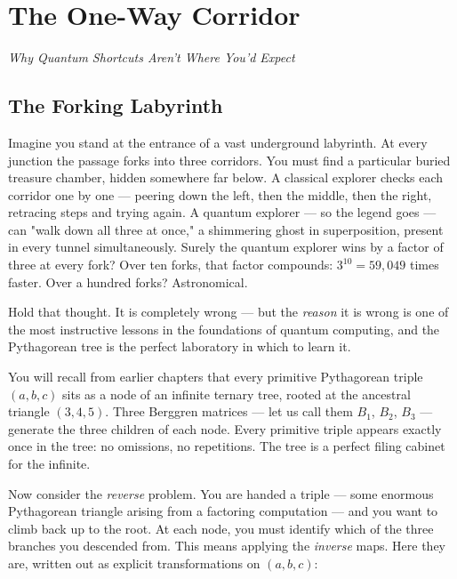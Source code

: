 \chapter{The One-Way Corridor}



\begin{center}\textit{Why Quantum Shortcuts Aren't Where You'd Expect}\end{center}
\bigskip


\ornbreak



\section{The Forking Labyrinth}


Imagine you stand at the entrance of a vast underground labyrinth. At every junction the passage forks into three corridors. You must find a particular buried treasure chamber, hidden somewhere far below. A classical explorer checks each corridor one by one --- peering down the left, then the middle, then the right, retracing steps and trying again. A quantum explorer --- so the legend goes --- can "walk down all three at once," a shimmering ghost in superposition, present in every tunnel simultaneously. Surely the quantum explorer wins by a factor of three at every fork? Over ten forks, that factor compounds: $3^{10} = 59{,}049$ times faster. Over a hundred forks? Astronomical.

Hold that thought. It is completely wrong --- but the \textit{reason} it is wrong is one of the most instructive lessons in the foundations of quantum computing, and the Pythagorean tree is the perfect laboratory in which to learn it.

You will recall from earlier chapters that every primitive Pythagorean triple $(a, b, c)$ sits as a node of an infinite ternary tree, rooted at the ancestral triangle $(3, 4, 5)$. Three Berggren matrices --- let us call them $B_1$, $B_2$, $B_3$ --- generate the three children of each node. Every primitive triple appears exactly once in the tree: no omissions, no repetitions. The tree is a perfect filing cabinet for the infinite.

Now consider the \textit{reverse} problem. You are handed a triple --- some enormous Pythagorean triangle arising from a factoring computation --- and you want to climb back up to the root. At each node, you must identify which of the three branches you descended from. This means applying the \textit{inverse} maps. Here they are, written out as explicit transformations on $(a, b, c)$:

